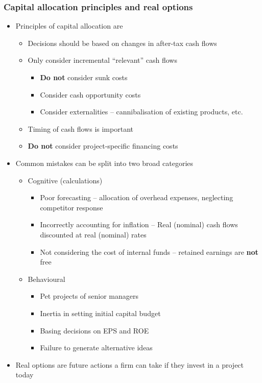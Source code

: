 \documentclass[../notes_compiled.tex]{subfiles}
\begin{document}
\subsubsection{Capital allocation principles and real options}
\begin{itemize}
\item Principles of capital allocation are
\begin{itemize}
\item Decisions should be based on changes in after-tax cash flows
\item Only consider incremental ``relevant'' cash flows
\begin{itemize}
\item \textbf{Do not} consider sunk costs
\item Consider cash opportunity costs
\item Consider externalities -- cannibalisation of existing products, etc.
\end{itemize}
\item Timing of cash flows is important
\item \textbf{Do not} consider project-specific financing costs
\end{itemize}
\item Common mistakes can be split into two broad categories
\begin{itemize}
\item Cognitive (calculations)
\begin{itemize}
\item Poor forecasting -- allocation of overhead expenses, neglecting competitor response
\item Incorrectly accounting for inflation -- Real (nominal) cash flows discounted at real (nominal) rates
\item Not considering the cost of internal funds -- retained earnings are \textbf{not} free
\end{itemize}
\item Behavioural
\begin{itemize}
\item Pet projects of senior managers
\item Inertia in setting initial capital budget
\item Basing decisions on EPS and ROE
\item Failure to generate alternative ideas
\end{itemize}
\end{itemize}
\item Real options are future actions a firm can take if they invest in a project today

\end{itemize}
\end{document}
